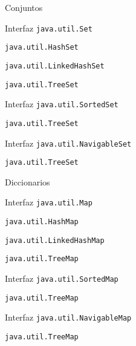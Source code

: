\begin{longenum}
    \begin{longenum}
        \item Conjuntos
        \begin{longenum}
            \item Interfaz \texttt{java.util.Set}
            \begin{longenum}
                \item \texttt{java.util.HashSet}
                \item \texttt{java.util.LinkedHashSet}
                \item \texttt{java.util.TreeSet}
            \end{longenum}
            \item Interfaz \texttt{java.util.SortedSet}
            \begin{longenum}
                \item \texttt{java.util.TreeSet}
            \end{longenum}
            \item Interfaz \texttt{java.util.NavigableSet}
            \begin{longenum}
                \item \texttt{java.util.TreeSet}
            \end{longenum}
        \end{longenum}
        \item Diccionarios
        \begin{longenum}
            \item Interfaz \texttt{java.util.Map}
            \begin{longenum}
                \item \texttt{java.util.HashMap}
                \item \texttt{java.util.LinkedHashMap}
                \item \texttt{java.util.TreeMap}
            \end{longenum}
            \item Interfaz \texttt{java.util.SortedMap}
            \begin{longenum}
                \item \texttt{java.util.TreeMap}
            \end{longenum}
            \item Interfaz \texttt{java.util.NavigableMap}
            \begin{longenum}
                \item \texttt{java.util.TreeMap}

\end{longenum}
\end{longenum}
\end{longenum}
\end{longenum}
